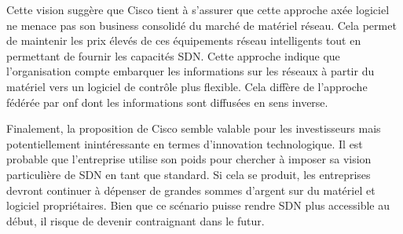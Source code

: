 Cette vision suggère que Cisco tient à s'assurer que cette approche axée logiciel ne menace pas son business consolidé du marché de matériel réseau. Cela permet de maintenir les prix élevés de ces équipements réseau intelligents tout en permettant de fournir les capacités SDN. Cette approche indique que l'organisation compte embarquer les informations sur les réseaux à partir du matériel vers un logiciel de contrôle plus flexible. Cela diffère de l'approche fédérée par \gls{onf} dont les informations sont diffusées en sens inverse. 



Finalement, la proposition de Cisco semble valable pour les investisseurs mais potentiellement inintéressante en termes d'innovation technologique. Il est probable que l'entreprise utilise son poids pour chercher à imposer sa vision particulière de SDN en tant que standard. Si cela se produit, les entreprises devront continuer à dépenser de grandes sommes d'argent sur du matériel et logiciel propriétaires. Bien que ce scénario puisse rendre SDN plus accessible au début, il risque de devenir contraignant dans le futur. \cite{ExecutiveGuideToSDNCisco}




